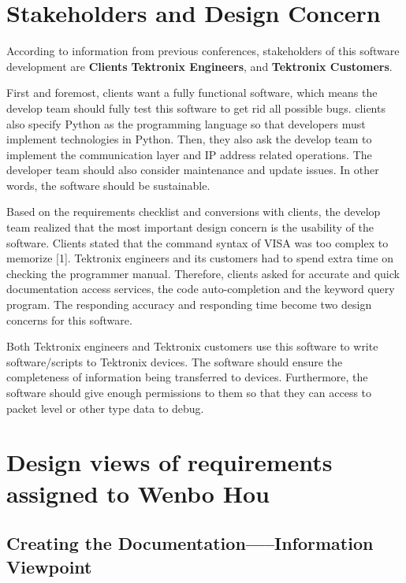 \documentclass [10pt]{article}
\begin{document}
\section{Stakeholders and Design Concern}
According to information from previous conferences, stakeholders of this software development are \textbf{Clients} \textbf{Tektronix Engineers}, and \textbf{Tektronix Customers}. \par
First and foremost, clients want a fully functional software, which means the develop team should fully test this software to get rid all possible bugs. clients also specify Python as the programming language so that developers must implement technologies in Python. Then, they also ask the develop team to implement the communication layer and IP address related operations. The developer team should also consider maintenance and update issues. In other words, the software should be sustainable. \par
Based on the requirements checklist and conversions with clients, the develop team realized that the most important design concern is the usability of the software. Clients stated that the command syntax of VISA was too complex to memorize [1]. Tektronix engineers and its customers had to spend extra time on checking the programmer manual. Therefore, clients asked for accurate and quick documentation access services, the code auto-completion and the keyword query program. The responding accuracy and responding time become two design concerns for this software.\par
Both Tektronix engineers and Tektronix customers use this software to write software/scripts to Tektronix devices. The software should ensure the completeness of information being transferred to devices. Furthermore, the software should give enough permissions to them so that they can access to packet level or other type data to debug.    
 

\section{Design views of requirements assigned to Wenbo Hou}
\subsection{Creating the Documentation-----Information Viewpoint}
\end{document}
